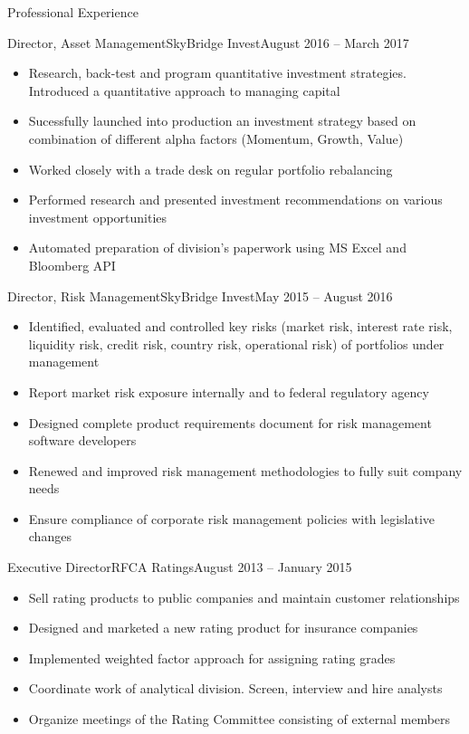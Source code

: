 \documentclass[]{mcdowellcv}
\begin{document}
\begin{cvsection}{Professional Experience}
  \begin{cvsubsection}{Director, Asset Management}{SkyBridge Invest}{August 2016 -- March 2017}		
    \begin{itemize}
      \item Research, back-test and program quantitative investment strategies. Introduced a quantitative approach to managing capital
      \item Sucessfully launched into production an investment strategy based on combination of different alpha factors (Momentum, Growth, Value)
      \item Worked closely with a trade desk on regular portfolio rebalancing
      \item Performed research and presented investment recommendations on various investment opportunities
      \item Automated preparation of division's paperwork using MS Excel and Bloomberg API
    \end{itemize}
  \end{cvsubsection}

  \begin{cvsubsection}{Director, Risk Management}{SkyBridge Invest}{May 2015 -- August 2016}		
    \begin{itemize}
      \item Identified, evaluated and controlled key risks (market risk, interest rate risk, liquidity risk, credit risk, country risk, operational risk) of portfolios under management
      \item Report market risk exposure internally and to federal regulatory agency
      \item Designed complete product requirements document for risk management software developers
      \item Renewed and improved risk management methodologies to fully suit company needs
      \item Ensure compliance of corporate risk management policies with legislative changes
    \end{itemize}
  \end{cvsubsection}

  \begin{cvsubsection}{Executive Director}{RFCA Ratings}{August 2013 -- January 2015}
    \begin{itemize}
      \item Sell rating products to public companies and maintain customer relationships
      \item Designed and marketed a new rating product for insurance companies
      \item Implemented weighted factor approach for assigning rating grades
      \item Coordinate work of analytical division. Screen, interview and hire analysts
      \item Organize meetings of the Rating Committee consisting of external members
    \end{itemize}
  \end{cvsubsection}


\end{cvsection}
\end{document}
